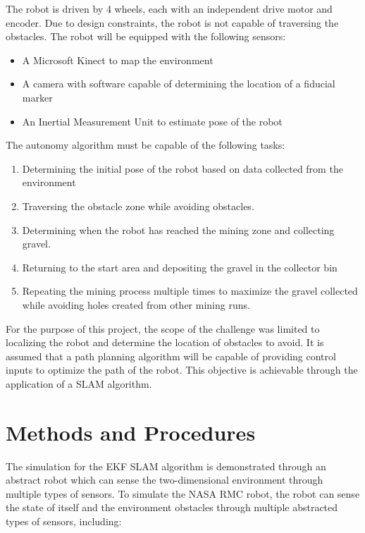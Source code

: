 \documentclass[journal]{IEEEtran}
\begin{document}
The robot is driven by 4 wheels, each with an independent drive motor and encoder. Due to 
design constraints, the robot is not capable of traversing the obstacles. The robot will be 
equipped with the following sensors:

\begin{itemize}
 \item A Microsoft Kinect to map the environment
 \item A camera with software capable of determining the location of a fiducial marker
 \item An Inertial Measurement Unit to estimate pose of the robot
\end{itemize}

The autonomy algorithm must be capable of the following tasks:

\begin{enumerate}
 \item Determining the initial pose of the robot based on data collected from the environment
 \item Traversing the obstacle zone while avoiding obstacles. 
 \item Determining when the robot has reached the mining zone and collecting gravel.
 \item Returning to the start area and depositing the gravel in the collector bin
 \item Repeating the mining process multiple times to maximize the gravel collected while 
 avoiding holes created from other mining runs.
\end{enumerate}

For the purpose of this project, the scope of the challenge was limited to localizing the robot
and determine the location of obstacles to avoid. It is assumed that a path planning algorithm 
will be capable of providing control inputs to optimize the path of the robot. This objective is 
achievable through the application of a SLAM algorithm.



\section{Methods and Procedures}

The simulation for the EKF SLAM algorithm is demonstrated through an abstract robot which 
can sense the two-dimensional environment through multiple types of sensors. To 
simulate the NASA RMC robot, the robot can sense the state of itself and the environment 
obstacles through multiple abstracted types of sensors, including:
\end{document}
